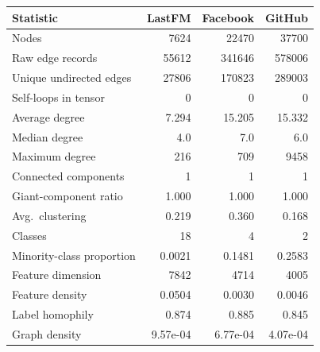 \begin{center}\scriptsize
\begin{tabular}{@{}lrrr@{}}
\toprule
Statistic & LastFM & Facebook & GitHub \\
\midrule
Nodes & 7624 & 22470 & 37700 \\
Raw edge records & 55612 & 341646 & 578006 \\
Unique undirected edges & 27806 & 170823 & 289003 \\
Self-loops in tensor & 0 & 0 & 0 \\
Average degree & 7.294 & 15.205 & 15.332 \\
Median degree & 4.0 & 7.0 & 6.0 \\
Maximum degree & 216 & 709 & 9458 \\
Connected components & 1 & 1 & 1 \\
Giant-component ratio & 1.000 & 1.000 & 1.000 \\
Avg.\ clustering & 0.219 & 0.360 & 0.168 \\
Classes & 18 & 4 & 2 \\
Minority-class proportion & 0.0021 & 0.1481 & 0.2583 \\
Feature dimension & 7842 & 4714 & 4005 \\
Feature density & 0.0504 & 0.0030 & 0.0046 \\
Label homophily & 0.874 & 0.885 & 0.845 \\
Graph density & 9.57e-04 & 6.77e-04 & 4.07e-04 \\
\bottomrule
\end{tabular}
\end{center}
